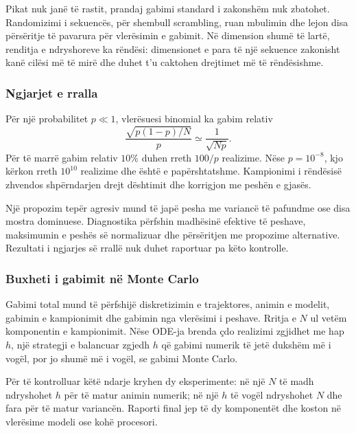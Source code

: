 \documentclass[11pt,oneside,openany]{book}
\begin{document}
Pikat nuk janë të rastit, prandaj gabimi standard i zakonshëm nuk zbatohet. Randomizimi i sekuencës, për shembull scrambling, ruan mbulimin dhe lejon disa përsëritje të pavarura për vlerësimin e gabimit. Në dimension shumë të lartë, renditja e ndryshoreve ka rëndësi: dimensionet e para të një sekuence zakonisht kanë cilësi më të mirë dhe duhet t'u caktohen drejtimet më të rëndësishme.

\subsubsection{Ngjarjet e rralla}
Për një probabilitet $p\ll1$, vlerësuesi binomial ka gabim relativ
\begin{equation}
 \frac{\sqrt{p(1-p)/N}}{p}\simeq\frac{1}{\sqrt{Np}}.
\end{equation}
Për të marrë gabim relativ $10\%$ duhen rreth $100/p$ realizime. Nëse $p=10^{-8}$, kjo kërkon rreth $10^{10}$ realizime dhe është e papërshtatshme. Kampionimi i rëndësisë zhvendos shpërndarjen drejt dështimit dhe korrigjon me peshën e gjasës.

Një propozim tepër agresiv mund të japë pesha me variancë të pafundme ose disa mostra dominuese. Diagnostika përfshin madhësinë efektive të peshave, maksimumin e peshës së normalizuar dhe përsëritjen me propozime alternative. Rezultati i ngjarjes së rrallë nuk duhet raportuar pa këto kontrolle.

\subsubsection{Buxheti i gabimit në Monte Carlo}
Gabimi total mund të përfshijë diskretizimin e trajektores, animin e modelit, gabimin e kampionimit dhe gabimin nga vlerësimi i peshave. Rritja e $N$ ul vetëm komponentin e kampionimit. Nëse ODE-ja brenda çdo realizimi zgjidhet me hap $h$, një strategji e balancuar zgjedh $h$ që gabimi numerik të jetë dukshëm më i vogël, por jo shumë më i vogël, se gabimi Monte Carlo.

Për të kontrolluar këtë ndarje kryhen dy eksperimente: në një $N$ të madh ndryshohet $h$ për të matur animin numerik; në një $h$ të vogël ndryshohet $N$ dhe fara për të matur variancën. Raporti final jep të dy komponentët dhe koston në vlerësime modeli ose kohë procesori.



\end{document}
